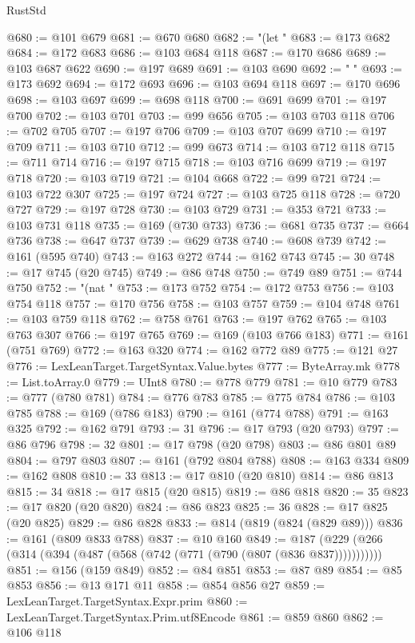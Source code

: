 \begin{lexlean}{RustStd}
\begin{coremodule}
@680 := @101 @679
@681 := @670 @680
@682 := "(let "
@683 := @173 @682
@684 := @172 @683
@686 := @103 @684 @118
@687 := @170 @686
@689 := @103 @687 @622
@690 := @197 @689
@691 := @103 @690
@692 := " "
@693 := @173 @692
@694 := @172 @693
@696 := @103 @694 @118
@697 := @170 @696
@698 := @103 @697
@699 := @698 @118
@700 := @691 @699
@701 := @197 @700
@702 := @103 @701
@703 := @99 @656
@705 := @103 @703 @118
@706 := @702 @705
@707 := @197 @706
@709 := @103 @707 @699
@710 := @197 @709
@711 := @103 @710
@712 := @99 @673
@714 := @103 @712 @118
@715 := @711 @714
@716 := @197 @715
@718 := @103 @716 @699
@719 := @197 @718
@720 := @103 @719
@721 := @104 @668
@722 := @99 @721
@724 := @103 @722 @307
@725 := @197 @724
@727 := @103 @725 @118
@728 := @720 @727
@729 := @197 @728
@730 := @103 @729
@731 := @353 @721
@733 := @103 @731 @118
@735 := @169 (@730 @733)
@736 := @681 @735
@737 := @664 @736
@738 := @647 @737
@739 := @629 @738
@740 := @608 @739
@742 := @161 (@595 @740)
@743 := @163 @272
@744 := @162 @743
@745 := 30
@748 := @17 @745 (@20 @745)
@749 := @86 @748
@750 := @749 @89
@751 := @744 @750
@752 := "(nat "
@753 := @173 @752
@754 := @172 @753
@756 := @103 @754 @118
@757 := @170 @756
@758 := @103 @757
@759 := @104 @748
@761 := @103 @759 @118
@762 := @758 @761
@763 := @197 @762
@765 := @103 @763 @307
@766 := @197 @765
@769 := @169 (@103 @766 @183)
@771 := @161 (@751 @769)
@772 := @163 @320
@774 := @162 @772 @89
@775 := @121 @27
@776 := LexLeanTarget.TargetSyntax.Value.bytes
@777 := ByteArray.mk
@778 := List.toArray.{0}
@779 := UInt8
@780 := @778 @779
@781 := @10 @779
@783 := @777 (@780 @781)
@784 := @776 @783
@785 := @775 @784
@786 := @103 @785
@788 := @169 (@786 @183)
@790 := @161 (@774 @788)
@791 := @163 @325
@792 := @162 @791
@793 := 31
@796 := @17 @793 (@20 @793)
@797 := @86 @796
@798 := 32
@801 := @17 @798 (@20 @798)
@803 := @86 @801 @89
@804 := @797 @803
@807 := @161 (@792 @804 @788)
@808 := @163 @334
@809 := @162 @808
@810 := 33
@813 := @17 @810 (@20 @810)
@814 := @86 @813
@815 := 34
@818 := @17 @815 (@20 @815)
@819 := @86 @818
@820 := 35
@823 := @17 @820 (@20 @820)
@824 := @86 @823
@825 := 36
@828 := @17 @825 (@20 @825)
@829 := @86 @828
@833 := @814 (@819 (@824 (@829 @89)))
@836 := @161 (@809 @833 @788)
@837 := @10 @160
@849 := @187 (@229 (@266 (@314 (@394 (@487 (@568 (@742 (@771 (@790 (@807 (@836 @837)))))))))))
@851 := @156 (@159 @849)
@852 := @84 @851
@853 := @87 @89
@854 := @85 @853
@856 := @13 @171 @11
@858 := @854 @856 @27
@859 := LexLeanTarget.TargetSyntax.Expr.prim
@860 := LexLeanTarget.TargetSyntax.Prim.utf8Encode
@861 := @859 @860
@862 := @106 @118

\end{coremodule}
\end{lexlean}
